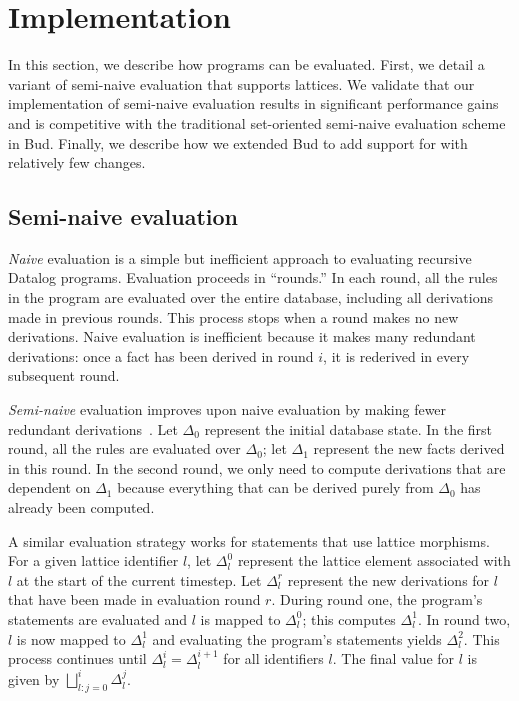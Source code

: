 \section{Implementation}
\label{sec:impl}

In this section, we describe how \lang programs can be evaluated. First, we
detail a variant of semi-naive evaluation that supports lattices. We validate
that our implementation of semi-naive evaluation results in significant
performance gains and is competitive with the traditional set-oriented
semi-naive evaluation scheme in Bud. Finally, we describe how we extended Bud to
add support for \lang with relatively few changes.

\subsection{Semi-naive evaluation}
\label{sec:lattice-eval-strat}
\emph{Naive} evaluation is a simple but inefficient approach to evaluating
recursive Datalog programs. Evaluation proceeds in ``rounds.'' In each round, all
the rules in the program are evaluated over the entire database, including all
derivations made in previous rounds. This process stops when a round makes no
new derivations. Naive evaluation is inefficient because it makes many redundant
derivations: once a fact has been derived in round $i$, it is rederived in every
subsequent round.

\emph{Semi-naive} evaluation improves upon naive evaluation by making fewer
redundant derivations~\cite{Balbin1987}. Let $\Delta_0$ represent the initial
database state. In the first round, all the rules are evaluated over $\Delta_0$;
let $\Delta_1$ represent the new facts derived in this round. In the second
round, we only need to compute derivations that are dependent on $\Delta_1$
because everything that can be derived purely from $\Delta_0$ has already been
computed.

A similar evaluation strategy works for \lang statements that use lattice
morphisms. For a given lattice identifier $l$, let $\Delta_l^0$ represent the
lattice element associated with $l$ at the start of the current timestep. Let
$\Delta^r_l$ represent the new derivations for $l$ that have been made in
evaluation round $r$. During round one, the program's statements are evaluated
and $l$ is mapped to $\Delta_l^0$; this computes $\Delta^1_l$. In round two, $l$
is now mapped to $\Delta^1_l$ and evaluating the program's statements yields
$\Delta^2_l$. This process continues until $\Delta^i_l = \Delta^{i+1}_l$ for all
identifiers $l$.  The final value for $l$ is given by $\bigsqcup_{l: j=0}^i
\Delta^j_l$.

